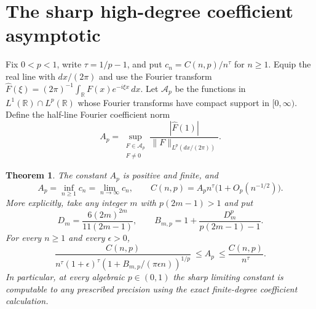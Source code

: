 \documentclass[11pt]{article}
\newtheorem{theorem}{Theorem}
\begin{document}
\section{The sharp high-degree coefficient asymptotic}

Fix \(0<p<1\), write \(\tau=1/p-1\), and put
\(c_n=C(n,p)/n^\tau\) for \(n\geq1\). Equip the real line with
\(dx/(2\pi)\) and use the Fourier transform
\(\widehat F(\xi)=(2\pi)^{-1}\int_{\mathbb R}F(x)e^{-i\xi x}\,dx\).
Let \(\mathcal A_p\) be the functions in \(L^1(\mathbb R)\cap
L^p(\mathbb R)\) whose Fourier transforms have compact support
in \([0,\infty)\). Define the half-line Fourier coefficient norm
\[
 A_p=\sup_{\substack{F\in\mathcal A_p\\F\ne0}}
       \frac{|\widehat F(1)|}{\|F\|_{L^p(dx/(2\pi))}}.
\]

\begin{theorem}\label{thm:hl-asymptotic}
The constant \(A_p\) is positive and finite, and
\[
 A_p=\inf_{n\geq1}c_n=\lim_{n\to\infty}c_n,
 \qquad
 C(n,p)=A_p n^\tau\bigl(1+O_p(n^{-1/2})\bigr).
\]
More explicitly, take any integer \(m\) with \(p(2m-1)>1\) and put
\[
 D_m=\frac{6(2m)^{2m}}{11(2m-1)},\qquad
 B_{m,p}=1+\frac{D_m^p}{p(2m-1)-1}.
\]
For every \(n\geq1\) and every \(\epsilon>0\),
\begin{equation}\label{eq:hl-effective}
 \frac{C(n,p)}
 {n^\tau(1+\epsilon)^\tau
      (1+B_{m,p}/(\pi\epsilon n))^{1/p}}
 \ \leq A_p\ \leq\frac{C(n,p)}{n^\tau}.
\end{equation}
In particular, at every algebraic \(p\in(0,1)\) the sharp limiting
constant is computable to any prescribed precision using the exact
finite-degree coefficient calculation.
\end{theorem}
\end{document}
